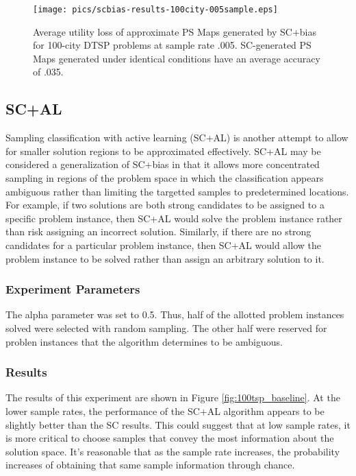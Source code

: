 \begin{figure}
\begin{center}
\texttt{[image: pics/scbias-results-100city-005sample.eps]}
\caption{Average utility loss of approximate PS Maps generated by SC+bias for 100-city DTSP problems at sample rate .005.  SC-generated PS Maps generated under identical conditions have an average accuracy of .035.}
\label{fig:scbias-results-100city-005sample}
\end{center}
\end{figure}



\subsection{SC+AL} 


Sampling classification with active learning (SC+AL) is another attempt to allow for smaller solution regions to be approximated effectively.  SC+AL may be considered a generalization of SC+bias in that it allows more concentrated sampling in regions of the problem space in which the classification appears ambiguous rather than limiting the targetted samples to predetermined locations.  For example, if two solutions are both strong candidates to be assigned to a specific problem instance, then SC+AL would solve the problem instance rather than risk assigning an incorrect solution.  Similarly, if there are no strong candidates for a particular problem instance, then SC+AL would allow the problem instance to be solved rather than assign an arbitrary solution to it.  

\subsubsection{Experiment Parameters}  The alpha parameter was set to 0.5.  Thus, half of the allotted problem instances solved were selected with random sampling.  The other half were reserved for problen instances that the algorithm determines to be ambiguous.

\subsubsection{Results} The results of this experiment are shown in Figure \ref{fig:100tsp_baseline}.  At the lower sample rates, the performance of the SC+AL algorithm appears to be slightly better than the SC results.  This could suggest that at low sample rates, it is more critical to choose samples that convey the most information about the solution space.  It's reasonable that as the sample rate increases, the probability increases of obtaining that same sample information through chance.


